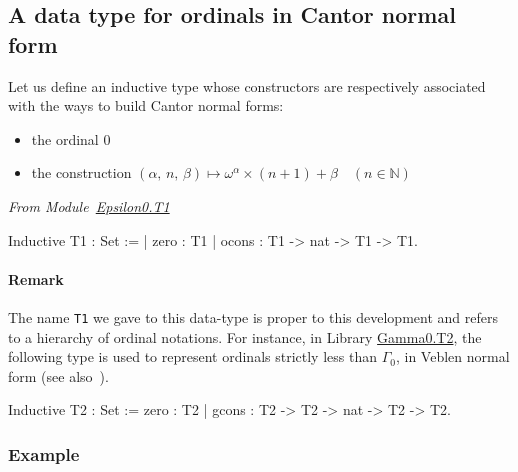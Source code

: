 \subsection{A data type for  ordinals in Cantor normal form}
\label{sec:orgheadline72}
\label{sec:T1-inductive-def}





    Let us define an inductive type whose 
constructors are respectively associated
with the ways to build Cantor normal forms:

\begin{itemize}
\item the ordinal \(0\)
\item the construction \((\alpha,\, n,\,\beta)  \mapsto \omega^\alpha \times (n + 1)+ \beta \quad (n\in\mathbb{N})\)
\end{itemize}


\vspace{4pt}
\noindent\emph{From Module~\href{../theories/html/hydras.Epsilon0.T1.html\#T1}{Epsilon0.T1}}

\label{types:T1}

\begin{Coqsrc}
Inductive T1 : Set  :=
| zero : T1
| ocons : T1 -> nat -> T1 -> T1.
\end{Coqsrc}



\paragraph{Remark}
The name \texttt{T1} we gave to this data-type  is proper to this development and refers
to a hierarchy of ordinal notations. For instance, in Library \href{../theories/html/hydras.Gamma0.T2.html}{Gamma0.T2},  the following type is used to represent ordinals strictly less than \(\Gamma_0\),  in Veblen normal form (see also~\cite{schutte}).
\noindent
\begin{Coqsrc}
Inductive T2 : Set :=
  zero : T2
| gcons : T2 -> T2 -> nat -> T2 -> T2.
\end{Coqsrc}

\subsubsection{Example}

